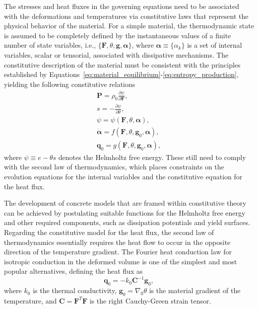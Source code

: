 The stresses and heat fluxes in the governing equations need to be associated with the deformations and temperatures via constitutive laws that represent the physical behavior of the material.
For a simple material, the thermodynamic state is assumed to be completely defined by the instantaneous values of a finite number of state variables, i.e., \(\{\bm{F}, \theta, \bm{g}, \bm{\alpha}\}\), where \(\bm{\alpha} \equiv \{\alpha_k\}\) is a set of internal variables, scalar or tensorial, associated with dissipative mechanisms.
The constitutive description of the material must be consistent with the principles established by Equations~\eqref{eq:material_equilibrium}-\eqref{eq:entropy_production}, yielding the following constitutive relations
\begin{gather}
  \bm{P} = \rho_0 \frac{\partial \psi}{\partial \bm{F}},\label{eq:constitutive_equation_stress_thermoelasticity}\\
  s = - \frac{\partial \psi}{\partial \theta},\\
  \psi = \psi(\bm{F},\theta, \bm{\alpha}),\label{eq:thermo_mech_helmholtz_free_energy}\\
  \dot{\bm{\alpha}} = f(\bm{F}, \theta, \bm{g}_0,\bm{\alpha}),\\
  \bm{q}_0 = g(\bm{F}, \theta, \bm{g}_0, \bm{\alpha}),
\end{gather}
where \(\psi \equiv e - \theta s\) denotes the Helmholtz free energy.
These still need to comply with the second law of thermodynamics, which places constraints on the evolution equations for the internal variables and the constitutive equation for the heat flux.

The development of concrete models that are framed within constitutive theory can be achieved by postulating suitable functions for the  Helmholtz free energy and other required components, such as dissipation potentials and yield surfaces.
Regarding the constitutive model for the heat flux, the second law of thermodynamics essentially requires the heat flow to occur in the opposite direction of the temperature gradient.
The Fourier heat conduction law for isotropic conduction in the deformed volume is one of the simplest and most popular alternatives, defining the heat flux as
\begin{equation}
  \bm{q}_0 = - k_0 \bm{C}^{-1} \bm{g}_0,
\end{equation}
where \(k_0\) is the thermal conductivity, \(\bm{g}_0 = \nabla_0 \theta\) is the material gradient of the temperature, and \(\bm{C} = \bm{F}^T \bm{F}\) is the right Cauchy-Green strain tensor.

